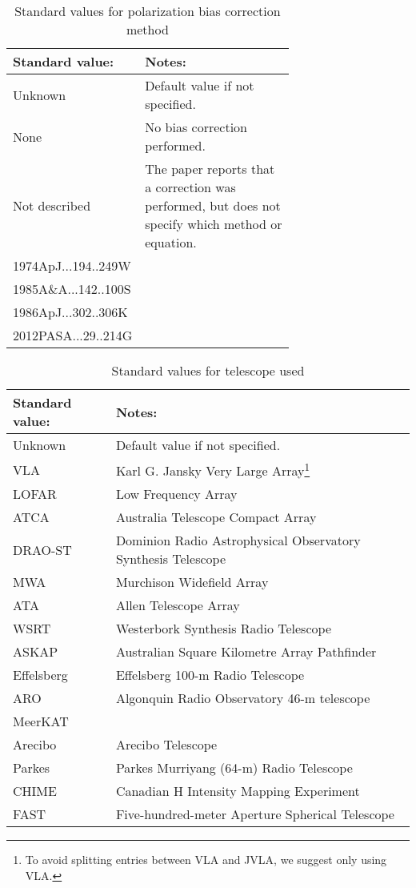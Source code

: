 \documentclass[10pt,modern]{aastex63}
\begin{document}
\begin{table}[h]
\caption{Standard values for polarization bias correction method}\label{tab:pol_bias}
\begin{center}
\begin{tabular}{|l|p{0.7\linewidth}|} \hline
{\bf Standard value:} & {\bf Notes:} \\ \hline
Unknown & Default value if not specified.\\
None & No bias correction performed.\\
Not described & The paper reports that a correction was performed, but does not specify which method or equation.\\
1974ApJ...194..249W & \citet{Wardle1974}\\
1985A\&A...142..100S & \citet{Simmons1985}\\
1986ApJ...302..306K & \citet{Killeen1986}\\
2012PASA...29..214G & \citet{George2012}\\
\hline
\end{tabular}
\end{center}
\label{default}
\end{table}%



\begin{table}[h]
\caption{Standard values for telescope used}\label{tab:telescope}
\begin{center}
\begin{tabular}{|l|l|} \hline
{\bf Standard value:} & {\bf Notes:} \\ \hline
Unknown & Default value if not specified.\\
VLA & Karl G. Jansky Very Large Array\footnote{To avoid splitting entries between VLA and JVLA, we suggest only using VLA.}\\
LOFAR & Low Frequency Array\\
ATCA & Australia Telescope Compact Array\\
DRAO-ST & Dominion Radio Astrophysical Observatory Synthesis Telescope\\
MWA & Murchison Widefield Array\\
ATA & Allen Telescope Array\\
WSRT & Westerbork Synthesis Radio Telescope\\
ASKAP & Australian Square Kilometre Array Pathfinder\\
Effelsberg & Effelsberg 100-m Radio Telescope\\
ARO & Algonquin Radio Observatory 46-m telescope\\
MeerKAT & \\
Arecibo & Arecibo Telescope\\
Parkes & Parkes Murriyang (64-m) Radio Telescope\\
CHIME & Canadian H Intensity Mapping Experiment\\
FAST & Five-hundred-meter Aperture Spherical Telescope\\
\hline
\end{tabular}
\end{center}
\label{default}
\end{table}%
\end{document}
